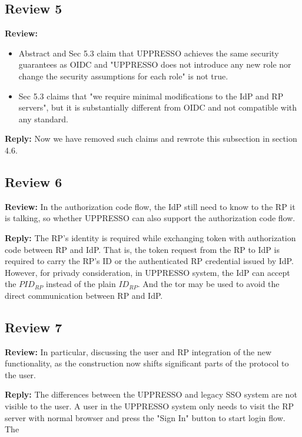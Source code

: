 \documentclass[letterpaper,onecolumn,10pt]{article}
\begin{document}
\subsection*{Review 5}
\vspace{1mm}\noindent\textbf{Review:}
\begin{itemize}
\item Abstract and Sec 5.3 claim that UPPRESSO achieves the same security guarantees as OIDC and "UPPRESSO does not introduce any new role nor change the security assumptions for each role" is not true.
 \item Sec 5.3 claims that "we require minimal modifications to the IdP and RP servers", but it is substantially different from OIDC and not compatible with any standard.

\end{itemize}


\vspace{1mm}\noindent\textbf{Reply:}
Now we have removed such claims and rewrote this subsection in section 4.6.

\subsection*{Review 6}
\vspace{1mm}\noindent\textbf{Review:}
In the authorization code flow, the IdP still need to know to the RP it is talking, so whether UPPRESSO can also support the authorization code flow.

\vspace{1mm}\noindent\textbf{Reply:}
The RP's identity is required while exchanging token with authorization code between RP and IdP.
That is, the token request from the RP to IdP is required to carry the RP's ID or the authenticated RP credential issued by IdP.
However, for privady consideration, in UPPRESSO system, the IdP can accept the $PID_{RP}$ instead of the plain $ID_{RP}$.
And the tor may be used to avoid the direct communication between RP and IdP.


\subsection*{Review 7}
\vspace{1mm}\noindent\textbf{Review:}
In particular, discussing the user and RP integration of the new functionality, as the construction now shifts significant parts of the protocol to the user.

\vspace{1mm}\noindent\textbf{Reply:}
The differences between the UPPRESSO and legacy SSO system are not visible to the user.
A user in the UPPRESSO system only needs to visit the RP server with normal browser and press the "Sign In" button to start login flow.
The
\end{document}
